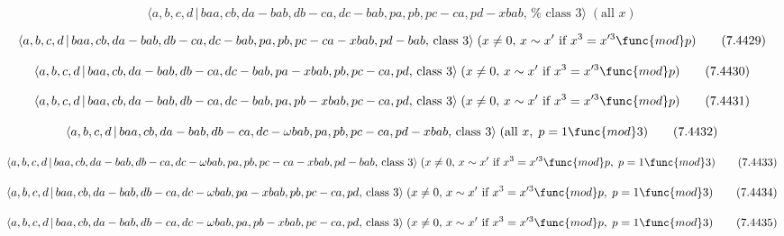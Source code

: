 \documentclass[10pt]{article}
\begin{document}
\begin{equation}
\langle a,b,c,d\,|\,baa,cb,da-bab,db-ca,dc-bab,pa,pb,pc-ca,pd-xbab,\,\text{%
class }3\rangle \;(\text{all }x)  \tag{7.4428}
\end{equation}

\begin{equation}
\langle a,b,c,d\,|\,baa,cb,da-bab,db-ca,dc-bab,pa,pb,pc-ca-xbab,pd-bab,\,%
\text{class }3\rangle \;(x\neq 0,\,x\sim x^{\prime }\text{ if }%
x^{3}=x^{\prime 3}\func{mod}p)  \tag{7.4429}
\end{equation}

\begin{equation}
\langle a,b,c,d\,|\,baa,cb,da-bab,db-ca,dc-bab,pa-xbab,pb,pc-ca,pd,\,\text{%
class }3\rangle \;(x\neq 0,\,x\sim x^{\prime }\text{ if }x^{3}=x^{\prime 3}%
\func{mod}p)  \tag{7.4430}
\end{equation}

\begin{equation}
\langle a,b,c,d\,|\,baa,cb,da-bab,db-ca,dc-bab,pa,pb-xbab,pc-ca,pd,\,\text{%
class }3\rangle \;(x\neq 0,\,x\sim x^{\prime }\text{ if }x^{3}=x^{\prime 3}%
\func{mod}p)  \tag{7.4431}
\end{equation}

\begin{equation}
\langle a,b,c,d\,|\,baa,cb,da-bab,db-ca,dc-\omega bab,pa,pb,pc-ca,pd-xbab,\,%
\text{class }3\rangle \;(\text{all }x,\;p=1\func{mod}3)  \tag{7.4432}
\end{equation}

\begin{equation}
\langle a,b,c,d\,|\,baa,cb,da-bab,db-ca,dc-\omega
bab,pa,pb,pc-ca-xbab,pd-bab,\,\text{class }3\rangle \;(x\neq 0,\,x\sim
x^{\prime }\text{ if }x^{3}=x^{\prime 3}\func{mod}p,\;p=1\func{mod}3) 
\tag{7.4433}
\end{equation}

\begin{equation}
\langle a,b,c,d\,|\,baa,cb,da-bab,db-ca,dc-\omega bab,pa-xbab,pb,pc-ca,pd,\,%
\text{class }3\rangle \;(x\neq 0,\,x\sim x^{\prime }\text{ if }%
x^{3}=x^{\prime 3}\func{mod}p,\;p=1\func{mod}3)  \tag{7.4434}
\end{equation}

\begin{equation}
\langle a,b,c,d\,|\,baa,cb,da-bab,db-ca,dc-\omega bab,pa,pb-xbab,pc-ca,pd,\,%
\text{class }3\rangle \;(x\neq 0,\,x\sim x^{\prime }\text{ if }%
x^{3}=x^{\prime 3}\func{mod}p,\;p=1\func{mod}3)  \tag{7.4435}
\end{equation}
\end{document}
